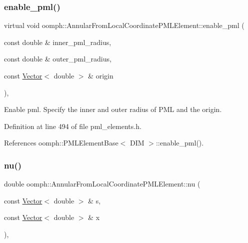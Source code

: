 \subsubsection{\texorpdfstring{enable\+\_\+pml()}{enable\_pml()}}
{\footnotesize\ttfamily virtual void oomph\+::\+Annular\+From\+Local\+Coordinate\+P\+M\+L\+Element\+::enable\+\_\+pml (\begin{DoxyParamCaption}\item[{const double \&}]{inner\+\_\+pml\+\_\+radius,  }\item[{const double \&}]{outer\+\_\+pml\+\_\+radius,  }\item[{const \hyperlink{classoomph_1_1Vector}{Vector}$<$ double $>$ \&}]{origin }\end{DoxyParamCaption})\hspace{0.3cm}{\ttfamily [inline]}, {\ttfamily [virtual]}}



Enable pml. Specify the inner and outer radius of P\+ML and the origin. 



Definition at line 494 of file pml\+\_\+elements.\+h.



References oomph\+::\+P\+M\+L\+Element\+Base$<$ D\+I\+M $>$\+::enable\+\_\+pml().

\mbox{\label{classoomph_1_1AnnularFromLocalCoordinatePMLElement_a161e427b6f1fc6349b9667caf346cf8a}} 
\subsubsection{\texorpdfstring{nu()}{nu()}}
{\footnotesize\ttfamily double oomph\+::\+Annular\+From\+Local\+Coordinate\+P\+M\+L\+Element\+::nu (\begin{DoxyParamCaption}\item[{const \hyperlink{classoomph_1_1Vector}{Vector}$<$ double $>$ \&}]{s,  }\item[{const \hyperlink{classoomph_1_1Vector}{Vector}$<$ double $>$ \&}]{x }\end{DoxyParamCaption})\hspace{0.3cm}{\ttfamily [inline]}, {\ttfamily [virtual]}}



